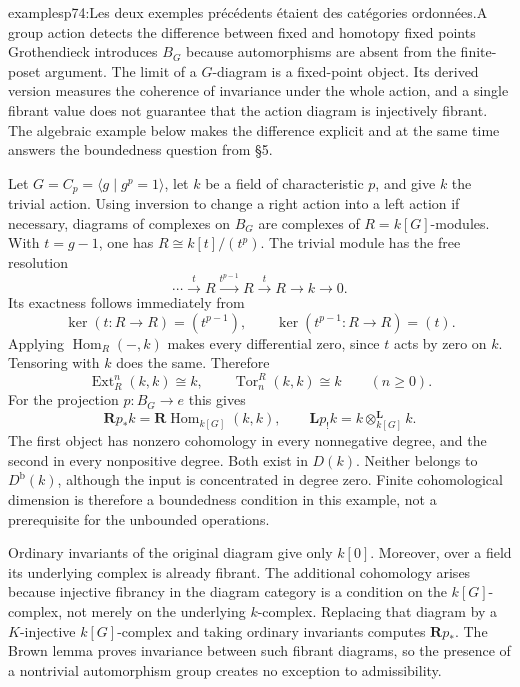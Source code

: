 \begin{dcomment}{examples}{p74:Les deux exemples précédents étaient des catégories ordonnées.}{A group action detects the difference between fixed and homotopy fixed points}
Grothendieck introduces $B_G$ because automorphisms are absent from the finite-poset argument. The limit of a $G$-diagram is a fixed-point object. Its derived version measures the coherence of invariance under the whole action, and a single fibrant value does not guarantee that the action diagram is injectively fibrant. The algebraic example below makes the difference explicit and at the same time answers the boundedness question from \S5.

Let $G=C_p=\langle g\mid g^p=1\rangle$, let $k$ be a field of characteristic $p$, and give $k$ the trivial action. Using inversion to change a right action into a left action if necessary, diagrams of complexes on $B_G$ are complexes of $R=k[G]$-modules. With $t=g-1$, one has $R\cong k[t]/(t^p)$. The trivial module has the free resolution
\[
 \cdots\xrightarrow{t}R\xrightarrow{t^{p-1}}R
       \xrightarrow{t}R\longrightarrow k\longrightarrow0.
\]
Its exactness follows immediately from
\[
       \ker(t:R\to R)=(t^{p-1}),\qquad
       \ker(t^{p-1}:R\to R)=(t).
\]
Applying $\operatorname{Hom}_R(-,k)$ makes every differential zero, since $t$ acts by zero on $k$. Tensoring with $k$ does the same. Therefore
\[
 \operatorname{Ext}^n_R(k,k)\cong k,
 \qquad \operatorname{Tor}^R_n(k,k)\cong k
 \qquad(n\geq0).
\]
For the projection $p:B_G\to e$ this gives
\[
 \mathbf Rp_*k=\mathbf R\operatorname{Hom}_{k[G]}(k,k),
 \qquad \mathbf Lp_!k=k\otimes^{\mathbf L}_{k[G]}k.
\]
The first object has nonzero cohomology in every nonnegative degree, and the second in every nonpositive degree. Both exist in $D(k)$. Neither belongs to $D^{\mathrm b}(k)$, although the input is concentrated in degree zero. Finite cohomological dimension is therefore a boundedness condition in this example, not a prerequisite for the unbounded operations.

Ordinary invariants of the original diagram give only $k[0]$. Moreover, over a field its underlying complex is already fibrant. The additional cohomology arises because injective fibrancy in the diagram category is a condition on the $k[G]$-complex, not merely on the underlying $k$-complex. Replacing that diagram by a $K$-injective $k[G]$-complex and taking ordinary invariants computes $\mathbf Rp_*$. The Brown lemma proves invariance between such fibrant diagrams, so the presence of a nontrivial automorphism group creates no exception to admissibility.


\end{dcomment}
